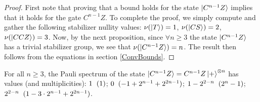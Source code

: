 \documentclass[12pt]{dalthesis}
\begin{document}
\begin{proof}
First note that proving that a bound holds for the state $\ket{C^{n-1}Z}$ implies that it holds for the gate $C^{n-1}Z$. To complete the proof, we simply compute and gather the following stabilizer nullity values: $\nu (\ket{T}) = 1$, $\nu (\ket{CS}) = 2$, $\nu (\ket{CCZ}) = 3$. Now, by the next proposition, since $\forall n \geq 3$ the state $\ket{C^{n-1}Z}$ has a trivial stabilizer group, we see that $\nu (\ket{C^{n-1}Z}) = n$. The result then follows from the equations in section \ref{ConvBounds}.
\end{proof}

\begin{proposition}
\label{prop4.2}
For all $n \geq 3$, the Pauli spectrum of the state $\ket{C^{n-1}Z} = C^{n-1}Z \ket{+}^{\otimes n}$ has values (and multiplicities): $1 \hspace{2mm} (1)$; $0 \hspace{2mm} (-1 +2^{n-1} + 2^{2n-1})$; $1-2^{2-n} \hspace{2mm} (2^n-1)$; $2^{2-n}  \hspace{2mm} (1-3 \cdot 2^{n-1} + 2^{2n-1})$.
\end{proposition}
\end{document}

